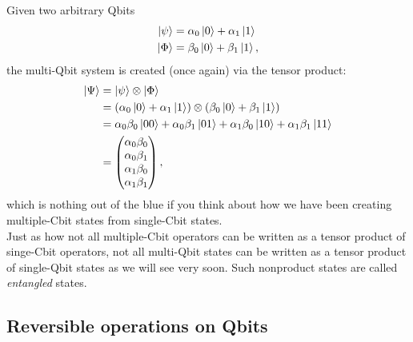 \documentclass{book}
\theoremstyle{definition}
\newcommand{\nn}{\nonumber}
\begin{document}
Given two arbitrary Qbits 
\begin{align}
\ket{\psi} &= \alpha_0\ket{0} + \alpha_1\ket{1} \nn\\
\ket{\Phi} &= \beta_0\ket{0} + \beta_1\ket{1},
\end{align}
the multi-Qbit system is created (once again) via the tensor product:
\begin{align}
\ket{\Psi} &=  \ket{\psi}\otimes\ket{\Phi} \nn\\
&= (\alpha_0\ket{0} + \alpha_1\ket{1})\otimes (\beta_0\ket{0} + \beta_1\ket{1})\nn\\
&= \alpha_0\beta_0\ket{00} + \alpha_0\beta_1\ket{01}+ \alpha_1\beta_0\ket{10} + \alpha_1\beta_1\ket{11}\nn\\
&= \begin{pmatrix}
\alpha_0\beta_0 \\ \alpha_0\beta_1 \\ \alpha_1\beta_0 \\ \alpha_1\beta_1
\end{pmatrix},
\end{align}
which is nothing out of the blue if you think about how we have been creating multiple-Cbit states from single-Cbit states. \\

Just as how not all multiple-Cbit operators can be written as a tensor product of singe-Cbit operators, not all multi-Qbit states can be written as a tensor product of single-Qbit states as we will see very soon. Such nonproduct states are called \textit{entangled} states.

 

















\subsection{Reversible operations on Qbits}
\end{document}
